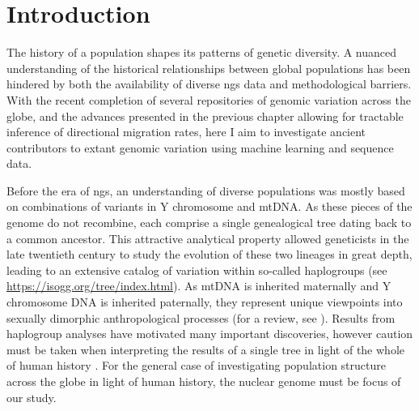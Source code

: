 \minitoc
\newpage



\section{Introduction}

The history of a population shapes its patterns of genetic diversity. A nuanced understanding of the historical relationships between global populations has been hindered by both the availability of diverse \gls{ngs} data and methodological barriers. With the recent completion of several repositories of genomic variation across the globe, and the advances presented in the previous chapter allowing for tractable inference of directional migration rates, here I aim to investigate ancient contributors to extant genomic variation using machine learning and sequence data. 

Before the era of \gls{ngs}, an understanding of diverse populations was mostly based on combinations of variants in Y chromosome and  \gls{mtDNA}. As these pieces of the genome do not recombine, each comprise a single genealogical tree dating back to a common ancestor. This attractive analytical property allowed geneticists in the late twentieth century to study the evolution of these two lineages in great depth, leading to an extensive catalog of variation within so-called haplogroups (see \url{https://isogg.org/tree/index.html}). As \gls{mtDNA} is inherited maternally and Y chromosome DNA is inherited paternally, they represent unique viewpoints into sexually dimorphic anthropological processes (for a review, see \textcite{Kivisild2015}). Results from haplogroup analyses have motivated many important discoveries, however caution must be taken when interpreting the results of a single tree in light of the whole of human history \cite{Rubinoff2005}. For the general case of investigating population structure across the globe in light of human history, the nuclear genome must be focus of our study.

